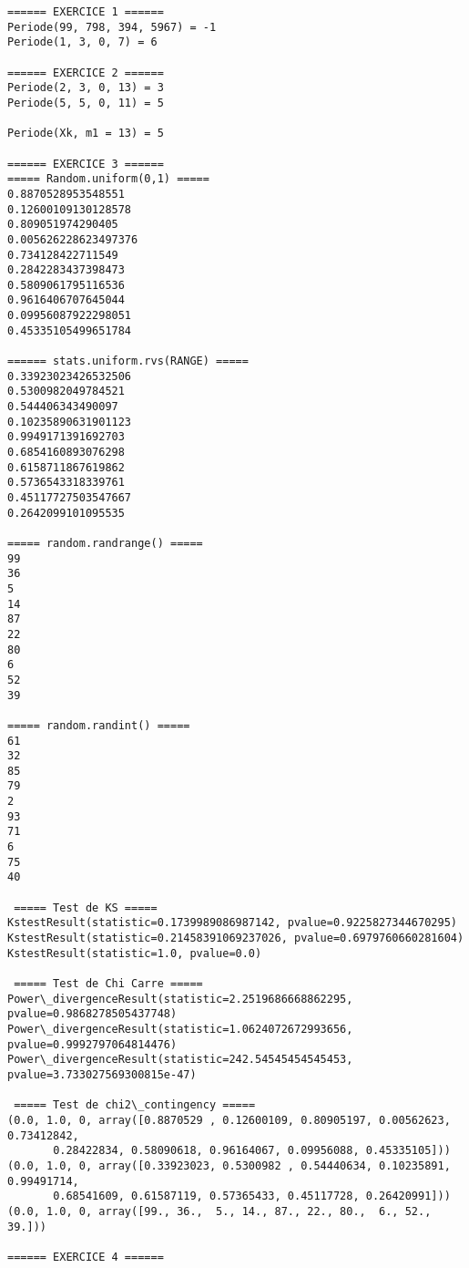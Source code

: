 \documentclass[11pt]{article}
\begin{document}
    \begin{Verbatim}[commandchars=\\\{\}]
====== EXERCICE 1 ======
Periode(99, 798, 394, 5967) = -1
Periode(1, 3, 0, 7) = 6

====== EXERCICE 2 ======
Periode(2, 3, 0, 13) = 3
Periode(5, 5, 0, 11) = 5

Periode(Xk, m1 = 13) = 5

====== EXERCICE 3 ======
===== Random.uniform(0,1) =====
0.8870528953548551
0.12600109130128578
0.809051974290405
0.005626228623497376
0.734128422711549
0.2842283437398473
0.5809061795116536
0.9616406707645044
0.09956087922298051
0.45335105499651784

====== stats.uniform.rvs(RANGE) =====
0.33923023426532506
0.5300982049784521
0.544406343490097
0.10235890631901123
0.9949171391692703
0.6854160893076298
0.6158711867619862
0.5736543318339761
0.45117727503547667
0.2642099101095535

===== random.randrange() =====
99
36
5
14
87
22
80
6
52
39

===== random.randint() =====
61
32
85
79
2
93
71
6
75
40

 ===== Test de KS =====
KstestResult(statistic=0.1739989086987142, pvalue=0.9225827344670295)
KstestResult(statistic=0.21458391069237026, pvalue=0.6979760660281604)
KstestResult(statistic=1.0, pvalue=0.0)

 ===== Test de Chi Carre =====
Power\_divergenceResult(statistic=2.2519686668862295, pvalue=0.9868278505437748)
Power\_divergenceResult(statistic=1.0624072672993656, pvalue=0.9992797064814476)
Power\_divergenceResult(statistic=242.54545454545453, pvalue=3.733027569300815e-47)

 ===== Test de chi2\_contingency =====
(0.0, 1.0, 0, array([0.8870529 , 0.12600109, 0.80905197, 0.00562623, 0.73412842,
       0.28422834, 0.58090618, 0.96164067, 0.09956088, 0.45335105]))
(0.0, 1.0, 0, array([0.33923023, 0.5300982 , 0.54440634, 0.10235891, 0.99491714,
       0.68541609, 0.61587119, 0.57365433, 0.45117728, 0.26420991]))
(0.0, 1.0, 0, array([99., 36.,  5., 14., 87., 22., 80.,  6., 52., 39.]))

====== EXERCICE 4 ======

    \end{Verbatim}


    
    
    
    
\end{document}
